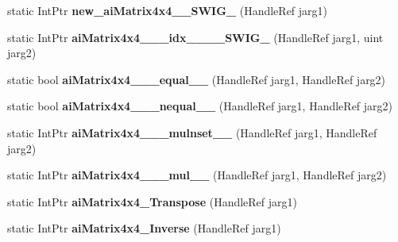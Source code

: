 \begin{DoxyCompactItemize}
\item 
\hypertarget{class_assimp_p_i_n_v_o_k_e_a712f0ae523c3c72349c51b8839418f4f}{static Int\+Ptr {\bfseries new\+\_\+ai\+Matrix4x4\+\_\+\+\_\+\+S\+W\+I\+G\+\_} (Handle\+Ref jarg1)}\label{class_assimp_p_i_n_v_o_k_e_a712f0ae523c3c72349c51b8839418f4f}

\item 
\hypertarget{class_assimp_p_i_n_v_o_k_e_a6dd4ed7b6c1be3f6692e5313ff32a6eb}{static Int\+Ptr {\bfseries ai\+Matrix4x4\+\_\+\+\_\+\+\_\+idx\+\_\+\+\_\+\+\_\+\+\_\+\+S\+W\+I\+G\+\_} (Handle\+Ref jarg1, uint jarg2)}\label{class_assimp_p_i_n_v_o_k_e_a6dd4ed7b6c1be3f6692e5313ff32a6eb}

\item 
\hypertarget{class_assimp_p_i_n_v_o_k_e_a7aa3db65e0e01778e8f46d37e83251e5}{static bool {\bfseries ai\+Matrix4x4\+\_\+\+\_\+\+\_\+equal\+\_\+\+\_\+} (Handle\+Ref jarg1, Handle\+Ref jarg2)}\label{class_assimp_p_i_n_v_o_k_e_a7aa3db65e0e01778e8f46d37e83251e5}

\item 
\hypertarget{class_assimp_p_i_n_v_o_k_e_aa89a1af171f7a3a5f594bef49b124259}{static bool {\bfseries ai\+Matrix4x4\+\_\+\+\_\+\+\_\+nequal\+\_\+\+\_\+} (Handle\+Ref jarg1, Handle\+Ref jarg2)}\label{class_assimp_p_i_n_v_o_k_e_aa89a1af171f7a3a5f594bef49b124259}

\item 
\hypertarget{class_assimp_p_i_n_v_o_k_e_a4384b6e1958ce3e7f248436270f4f054}{static Int\+Ptr {\bfseries ai\+Matrix4x4\+\_\+\+\_\+\+\_\+mulnset\+\_\+\+\_\+} (Handle\+Ref jarg1, Handle\+Ref jarg2)}\label{class_assimp_p_i_n_v_o_k_e_a4384b6e1958ce3e7f248436270f4f054}

\item 
\hypertarget{class_assimp_p_i_n_v_o_k_e_ae51e874dbb6415b6ab5f5e46c6f79dda}{static Int\+Ptr {\bfseries ai\+Matrix4x4\+\_\+\+\_\+\+\_\+mul\+\_\+\+\_\+} (Handle\+Ref jarg1, Handle\+Ref jarg2)}\label{class_assimp_p_i_n_v_o_k_e_ae51e874dbb6415b6ab5f5e46c6f79dda}

\item 
\hypertarget{class_assimp_p_i_n_v_o_k_e_ac619e4faec79ac22d1490534feba26c6}{static Int\+Ptr {\bfseries ai\+Matrix4x4\+\_\+\+Transpose} (Handle\+Ref jarg1)}\label{class_assimp_p_i_n_v_o_k_e_ac619e4faec79ac22d1490534feba26c6}

\item 
\hypertarget{class_assimp_p_i_n_v_o_k_e_aa4815d384335b56d683f4bf6e087d150}{static Int\+Ptr {\bfseries ai\+Matrix4x4\+\_\+\+Inverse} (Handle\+Ref jarg1)}\label{class_assimp_p_i_n_v_o_k_e_aa4815d384335b56d683f4bf6e087d150}


\end{DoxyCompactItemize}
